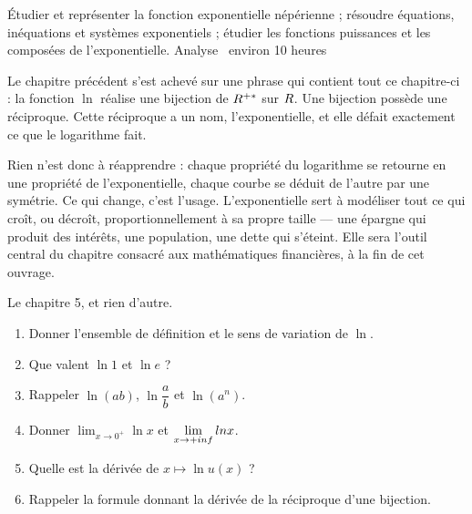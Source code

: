   {Étudier et représenter la fonction exponentielle népérienne ; résoudre
   équations, inéquations et systèmes exponentiels ; étudier les fonctions
   puissances et les composées de l'exponentielle.}
  {Analyse \textbullet\ environ 10 heures}

Le chapitre précédent s'est achevé sur une phrase qui contient tout ce
chapitre-ci : la fonction $\ln$ réalise une bijection de $R^{+*}$ sur $R$. Une
bijection possède une réciproque. Cette réciproque a un nom, l'exponentielle,
et elle défait exactement ce que le logarithme fait.

Rien n'est donc à réapprendre : chaque propriété du logarithme se retourne en
une propriété de l'exponentielle, chaque courbe se déduit de l'autre par une
symétrie. Ce qui change, c'est l'usage. L'exponentielle sert à modéliser tout
ce qui croît, ou décroît, proportionnellement à sa propre taille — une
épargne qui produit des intérêts, une population, une dette qui s'éteint. Elle
sera l'outil central du chapitre consacré aux mathématiques financières, à la
fin de cet ouvrage.

\begin{revision}
Le chapitre 5, et rien d'autre.

\begin{enumerate}[label=\textbf{\arabic*.}, leftmargin=*, itemsep=0.35em]
  \item Donner l'ensemble de définition et le sens de variation de $\ln$.
  \item Que valent $\ln 1$ et $\ln e$ ?
  \item Rappeler $\ln(ab)$, $\ln\dfrac{a}{b}$ et $\ln(a^{n})$.
  \item Donner $\displaystyle\lim_{x\to0^{+}}\ln x$ et $\limpinf \ln x$.
  \item Quelle est la dérivée de $x \mapsto \ln u(x)$ ?
  \item Rappeler la formule donnant la dérivée de la réciproque d'une
        bijection.
\end{enumerate}
\end{revision}

